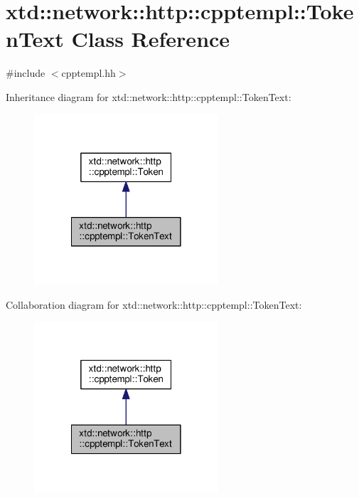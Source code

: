 \hypertarget{classxtd_1_1network_1_1http_1_1cpptempl_1_1TokenText}{\section{xtd\-:\-:network\-:\-:http\-:\-:cpptempl\-:\-:Token\-Text Class Reference}
\label{classxtd_1_1network_1_1http_1_1cpptempl_1_1TokenText}
}


{\ttfamily \#include $<$cpptempl.\-hh$>$}



Inheritance diagram for xtd\-:\-:network\-:\-:http\-:\-:cpptempl\-:\-:Token\-Text\-:
\nopagebreak
\begin{figure}[H]
\begin{center}
\leavevmode
\includegraphics[width=194pt]{classxtd_1_1network_1_1http_1_1cpptempl_1_1TokenText__inherit__graph}
\end{center}
\end{figure}


Collaboration diagram for xtd\-:\-:network\-:\-:http\-:\-:cpptempl\-:\-:Token\-Text\-:
\nopagebreak
\begin{figure}[H]
\begin{center}
\leavevmode
\includegraphics[width=194pt]{classxtd_1_1network_1_1http_1_1cpptempl_1_1TokenText__coll__graph}
\end{center}
\end{figure}
